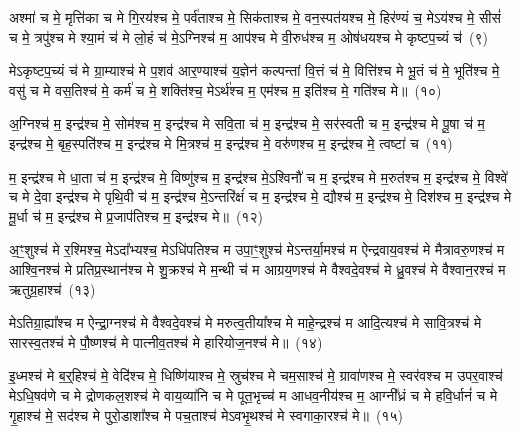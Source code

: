 {\anuvakamend[{वि॒भु च॑ म॒सुरा॒श्चतु॑र्दश च}]}

अश्मा॑ च मे॒ मृत्ति॑का च मे गि॒रय॑श्च मे॒ पर्व॑ताश्च मे॒ सिक॑ताश्च मे॒ वन॒स्पत॑यश्च मे॒ हिर॑ण्यं च॒ मे\-ऽय॑श्च मे॒ सीसं॑ च मे॒ त्रपु॑श्च मे श्या॒मं च॑ मे लो॒हं च॑ मे॒\-ऽग्निश्च॑ म॒ आप॑श्च मे वी॒रुध॑श्च म॒ ओष॑धयश्च मे कृष्टप॒च्यं च॑~(९)\ip

मे\-ऽकृष्टप॒च्यं च॑ मे ग्रा॒म्याश्च॑ मे प॒शव॑ आर॒ण्याश्च॑ य॒ज्ञेन॑ कल्पन्तां वि॒त्तं च॑ मे॒ वित्ति॑श्च मे भू॒तं च॑ मे॒ भूति॑श्च मे॒ वसु॑ च मे वस॒तिश्च॑ मे॒ कर्म॑ च मे॒ शक्ति॑श्च॒ मे\-ऽर्थ॑श्च म॒ एम॑श्च म॒ इति॑श्च मे॒ गति॑श्च मे॥~(१०)\ip

{\anuvakamend[{कृ॒ष्ट॒प॒च्यञ्चा॒ष्टाच॑त्वारिꣳशच्च}]}

अ॒ग्निश्च॑ म॒ इन्द्र॑श्च मे॒ सोम॑श्च म॒ इन्द्र॑श्च मे सवि॒ता च॑ म॒ इन्द्र॑श्च मे॒ सर॑स्वती च म॒ इन्द्र॑श्च मे पू॒षा च॑ म॒ इन्द्र॑श्च मे॒ बृह॒स्पति॑श्च म॒ इन्द्र॑श्च मे मि॒त्रश्च॑ म॒ इन्द्र॑श्च मे॒ वरु॑णश्च म॒ इन्द्र॑श्च मे॒ त्वष्टा॑ च~(११)\ip

म॒ इन्द्र॑श्च मे धा॒ता च॑ म॒ इन्द्र॑श्च मे॒ विष्णु॑श्च म॒ इन्द्र॑श्च मे॒\-ऽश्विनौ॑ च म॒ इन्द्र॑श्च मे म॒रुत॑श्च म॒ इन्द्र॑श्च मे॒ विश्वे॑ च मे दे॒वा इन्द्र॑श्च मे पृथि॒वी च॑ म॒ इन्द्र॑श्च मे॒\-ऽन्तरि॑क्षंं च म॒ इन्द्र॑श्च मे॒ द्यौश्च॑ म॒ इन्द्र॑श्च मे॒ दिश॑श्च म॒ इन्द्र॑श्च मे मू॒र्धा च॑ म॒ इन्द्र॑श्च मे प्र॒जा\-प॑तिश्च म॒ इन्द्र॑श्च मे॥~(१२)\ip

{\anuvakamend[{त्वष्टा॑ च॒ द्यौश्च॑ म॒ एक॑विꣳशतिश्च}]}

अ॒ꣳ॒शुश्च॑ मे र॒श्मिश्च॒ मे\-ऽदा᳚भ्यश्च॒ मे\-ऽधि॑\-पतिश्च म उपा॒ꣳ॒शुश्च॑ मे\-ऽन्तर्या॒मश्च॑ म ऐन्द्रवाय॒वश्च॑ मे मैत्रावरु॒णश्च॑ म आश्वि॒नश्च॑ मे प्रतिप्र॒स्थान॑श्च मे शु॒क्रश्च॑ मे म॒न्थी च॑ म आग्रय॒णश्च॑ मे वैश्वदे॒वश्च॑ मे ध्रु॒वश्च॑ मे वैश्वान॒रश्च॑ म ऋतुग्र॒हाश्च॑~(१३)\ip

मे\-ऽतिग्रा॒ह्या᳚श्च म ऐन्द्रा॒ग्नश्च॑ मे वैश्वदे॒वश्च॑ मे मरुत्व॒तीया᳚श्च मे माहे॒न्द्रश्च॑ म आदि॒त्यश्च॑ मे सावि॒त्रश्च॑ मे सारस्व॒तश्च॑ मे पौ॒ष्णश्च॑ मे पात्नीव॒तश्च॑ मे हारियोज॒नश्च॑ मे॥~(१४)\ip

{\anuvakamend[{ऋ॒तु॒ग्र॒हाश्च॒ चतु॑स्त्रिꣳशच्च}]}

इ॒ध्मश्च॑ मे ब॒र्॒\mbox{}हिश्च॑ मे॒ वेदि॑श्च मे॒ धिष्णि॑याश्च मे॒ स्रुच॑श्च मे चम॒साश्च॑ मे॒ ग्रावा॑णश्च मे॒ स्वर॑वश्च म उपर॒वाश्च॑ मे\-ऽधि॒षव॑णे च मे द्रोणकल॒शश्च॑ मे वाय॒व्या॑नि च मे पूत॒भृच्च॑ म आधव॒नीय॑श्च म॒ आग्नी᳚ध्रं च मे हवि॒र्धानं॑ च मे गृ॒हाश्च॑ मे॒ सद॑श्च मे पुरो॒डाशा᳚श्च मे पच॒ताश्च॑ मे\-ऽवभृ॒थश्च॑ मे स्वगाका॒रश्च॑ मे॥~(१५)\ip

